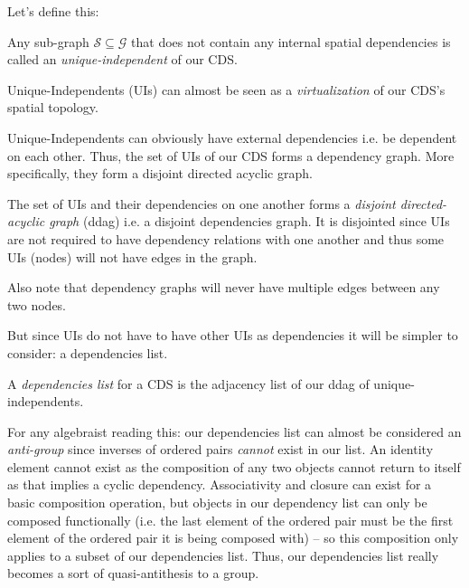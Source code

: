Let's define this:

\begin{con-def}
	\label{independents}
	Any sub-graph $\mathcal{S} \subseteq \mathcal{G}$ that does not contain any internal spatial dependencies is called an \textit{unique-independent} of our CDS.
\end{con-def}

Unique-Independents (UIs) can almost be seen as a \textit{virtualization} of our CDS's spatial topology.

Unique-Independents can obviously have external dependencies i.e. be dependent on each other. Thus, the set of UIs of our CDS forms a dependency graph. More specifically, they form a disjoint directed acyclic graph.

\begin{con-def}
	\label{ddag}
	The set of UIs and their dependencies on one another forms a \textit{disjoint directed-acyclic graph} (ddag) i.e. a disjoint dependencies graph. It is disjointed since UIs are not required to have dependency relations with one another and thus some UIs (nodes) will not have edges in the graph.
\end{con-def}

Also note that dependency graphs will never have multiple edges between any two nodes.

But since UIs do not have to have other UIs as dependencies it will be simpler to consider: a dependencies list.

\begin{con-def}
	\label{dependency-list}
	A \textit{dependencies list} for a CDS is the adjacency list of our ddag of unique-independents.
\end{con-def}

\if
For any algebraist reading this: our dependencies list can almost be considered an \textit{anti-group} since inverses of ordered pairs \textit{cannot} exist in our list. An identity element cannot exist as the composition of any two objects cannot return to itself as that implies a cyclic dependency. Associativity and closure can exist for a basic composition operation, but objects in our dependency list can only be composed functionally (i.e. the last element of the ordered pair must be the first element of the ordered pair it is being composed with) -- so this composition only applies to a subset of our dependencies list. Thus, our dependencies list really becomes a sort of quasi-antithesis to a group.
\fi

